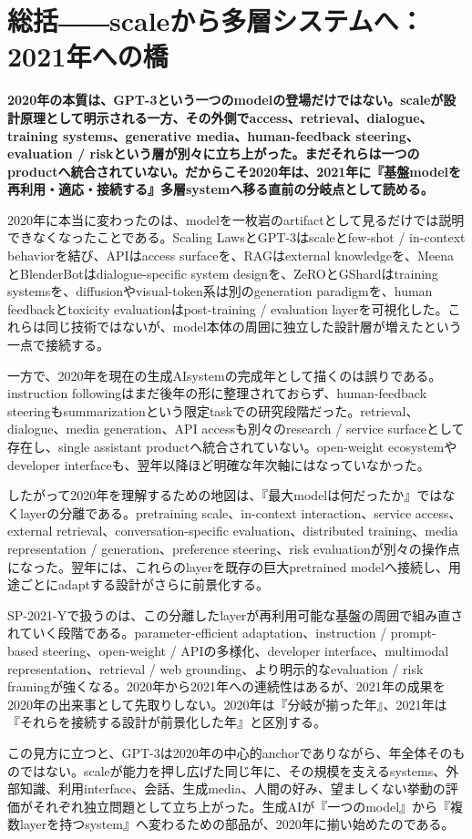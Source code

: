 \section{総括――scaleから多層システムへ：2021年への橋}
\noindent\textbf{2020年の本質は、GPT-3という一つのmodelの登場だけではない。scaleが設計原理として明示される一方、その外側でaccess、retrieval、dialogue、training systems、generative media、human-feedback steering、evaluation / riskという層が別々に立ち上がった。まだそれらは一つのproductへ統合されていない。だからこそ2020年は、2021年に『基盤modelを再利用・適応・接続する』多層systemへ移る直前の分岐点として読める。}

2020年に本当に変わったのは、modelを一枚岩のartifactとして見るだけでは説明できなくなったことである。Scaling LawsとGPT-3はscaleとfew-shot / in-context behaviorを結び、APIはaccess surfaceを、RAGはexternal knowledgeを、MeenaとBlenderBotはdialogue-specific system designを、ZeROとGShardはtraining systemsを、diffusionやvisual-token系は別のgeneration paradigmを、human feedbackとtoxicity evaluationはpost-training / evaluation layerを可視化した。これらは同じ技術ではないが、model本体の周囲に独立した設計層が増えたという一点で接続する。


一方で、2020年を現在の生成AIsystemの完成年として描くのは誤りである。instruction followingはまだ後年の形に整理されておらず、human-feedback steeringもsummarizationという限定taskでの研究段階だった。retrieval、dialogue、media generation、API accessも別々のresearch / service surfaceとして存在し、single assistant productへ統合されていない。open-weight ecosystemやdeveloper interfaceも、翌年以降ほど明確な年次軸にはなっていなかった。


したがって2020年を理解するための地図は、『最大modelは何だったか』ではなくlayerの分離である。pretraining scale、in-context interaction、service access、external retrieval、conversation-specific evaluation、distributed training、media representation / generation、preference steering、risk evaluationが別々の操作点になった。翌年には、これらのlayerを既存の巨大pretrained modelへ接続し、用途ごとにadaptする設計がさらに前景化する。


SP-2021-Yで扱うのは、この分離したlayerが再利用可能な基盤の周囲で組み直されていく段階である。parameter-efficient adaptation、instruction / prompt-based steering、open-weight / APIの多様化、developer interface、multimodal representation、retrieval / web grounding、より明示的なevaluation / risk framingが強くなる。2020年から2021年への連続性はあるが、2021年の成果を2020年の出来事として先取りしない。2020年は『分岐が揃った年』、2021年は『それらを接続する設計が前景化した年』と区別する。


この見方に立つと、GPT-3は2020年の中心的anchorでありながら、年全体そのものではない。scaleが能力を押し広げた同じ年に、その規模を支えるsystems、外部知識、利用interface、会話、生成media、人間の好み、望ましくない挙動の評価がそれぞれ独立問題として立ち上がった。生成AIが『一つのmodel』から『複数layerを持つsystem』へ変わるための部品が、2020年に揃い始めたのである。
